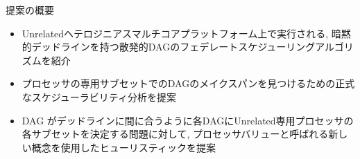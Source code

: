 
\begin{frame}{提案の概要}
    \begin{itemize}
        \item Unrelatedヘテロジニアスマルチコアプラットフォーム上で実行される, 暗黙的デッドラインを持つ散発的DAGのフェデレートスケジューリングアルゴリズムを紹介

        \item プロセッサの専用サブセットでのDAGのメイクスパンを見つけるための正式なスケジューラビリティ分析を提案

        \item DAG がデッドラインに間に合うように各DAGにUnrelated専用プロセッサの各サブセットを決定する問題に対して, プロセッサバリューと呼ばれる新しい概念を使用したヒューリスティックを提案
    \end{itemize}
\end{frame}
